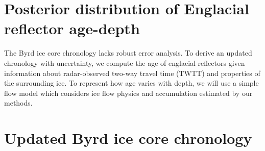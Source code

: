\documentclass[letterpaper]{igs}
\begin{document}
\section{Posterior distribution of Englacial reflector age-depth}\label{byrdchronology}
The Byrd ice core chronology lacks robust error analysis. To derive an updated chronology with uncertainty, we compute the age of englacial reflectors given information about radar-observed two-way travel time (TWTT) and properties of the surrounding ice. To represent how age varies with depth, we will use a simple flow model which considers ice flow physics and accumulation estimated by our methods.

	
	
\section{Updated Byrd ice core chronology}\label{agedepthresults}


%



\end{document}
